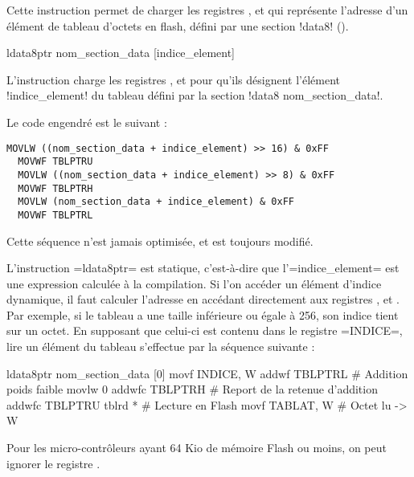 


Cette instruction permet de charger les registres ,  et  qui représente l'adresse d'un élément de tableau d'octets en flash, défini par une section \pic!data8! ().


\begin{piccolo}
  ldata8ptr nom_section_data [indice_element]
\end{piccolo}

L'instruction charge les registres ,  et  pour qu'ils désignent l'élément \pic!indice_element! du tableau défini par la section \pic!data8 nom_section_data!.

Le code engendré est le suivant :
\begin{lstlisting}[language=assembleur]
  MOVLW ((nom_section_data + indice_element) >> 16) & 0xFF
  MOVWF TBLPTRU
  MOVLW ((nom_section_data + indice_element) >> 8) & 0xFF
  MOVWF TBLPTRH
  MOVLW (nom_section_data + indice_element) & 0xFF
  MOVWF TBLPTRL
\end{lstlisting}

Cette séquence n'est jamais optimisée, et  est toujours modifié.

L'instruction \pic=ldata8ptr= est statique, c'est-à-dire que l'\pic=indice_element= est une expression calculée à la compilation. Si l'on accéder un élément d'indice dynamique, il faut calculer l'adresse en accédant directement aux registres ,  et . Par exemple, si le tableau a une taille inférieure ou égale à 256, son indice tient sur un octet. En supposant que celui-ci est contenu dans le registre \pic=INDICE=, lire un élément du tableau s'effectue par la séquence suivante :

\begin{piccolo}
  ldata8ptr nom_section_data [0]
  movf INDICE, W
  addwf TBLPTRL   # Addition poids faible
  movlw 0
  addwfc TBLPTRH  # Report de la retenue d'addition
  addwfc TBLPTRU
  tblrd *         # Lecture en Flash 
  movf TABLAT, W  # Octet lu -> W
\end{piccolo}

Pour les micro-contrôleurs ayant 64 Kio de mémoire Flash ou moins, on peut ignorer le registre .

